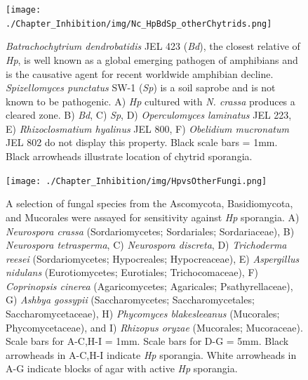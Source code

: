 \begin{figure}[hb]
  \centering
  \texttt{[image: ./Chapter\_Inhibition/img/Nc\_HpBdSp\_otherChytrids.png]}
  \caption[Inhibition appears unique to \textit{Hp} among other chytrids.]{\textit{Batrachochytrium dendrobatidis} JEL 423 (\textit{Bd}), the closest relative of \textit{Hp}, is well known as a global emerging pathogen of amphibians and is the causative agent for recent worldwide amphibian decline. \textit{Spizellomyces punctatus} SW-1 (\textit{Sp}) is a soil saprobe and is not known to be pathogenic. A) \textit{Hp} cultured with \textit{N. crassa} produces a cleared zone. B) \textit{Bd}, C) \textit{Sp}, D) \textit{Operculomyces laminatus} JEL 223, E) \textit{Rhizoclosmatium hyalinus} JEL 800, F) \textit{Obelidium mucronatum} JEL 802 do not display this property. Black scale bars = 1mm. Black arrowheads illustrate location of chytrid sporangia.}
  \label{fig:ChInhib_NcraChytrid}
\end{figure}

\begin{figure}[hb]
  \centering
  \texttt{[image: ./Chapter\_Inhibition/img/HpvsOtherFungi.png]}
  \caption[Inhibition is not specific to \textit{N. crassa}.]{A selection of fungal species from the Ascomycota, Basidiomycota, and Mucorales were assayed for sensitivity against \textit{Hp} sporangia. A) \textit{Neurospora crassa} (Sordariomycetes; Sordariales; Sordariaceae), B) \textit{Neurospora tetrasperma}, C) \textit{Neurospora discreta}, D) \textit{Trichoderma reesei} (Sordariomycetes; Hypocreales; Hypocreaceae), E) \textit{Aspergillus nidulans} (Eurotiomycetes; Eurotiales; Trichocomaceae), F) \textit{Coprinopsis cinerea} (Agaricomycetes; Agaricales; Psathyrellaceae), G) \textit{Ashbya gossypii} (Saccharomycetes; Saccharomycetales; Saccharomycetaceae), H) \textit{Phycomyces blakesleeanus} (Mucorales; Phycomycetaceae), and I) \textit{Rhizopus oryzae} (Mucorales; Mucoraceae). Scale bars for A-C,H-I = 1mm. Scale bars for D-G = 5mm. Black arrowheads in A-C,H-I indicate \textit{Hp} sporangia. White arrowheads in A-G indicate blocks of agar with active \textit{Hp} sporangia.}
  \label{fig:ChInhib_HpOtherFungi}
\end{figure}

